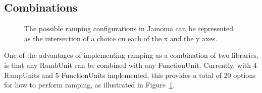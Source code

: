 \documentclass{article}
\begin{document}



\subsection{Combinations} %
\label{sec:combinations}

\begin{figure}
\centerline{}
\caption{The possible ramping configurations in Jamoma can be represented as the intersection of a choice on each of the x and the y axes.}
\label{fig:combinations}
\end{figure}

One of the advantages of implementing ramping as a combination of two libraries, is that any RambUnit can be combined with any FunctionUnit. Currently, with 4 RampUnits and 5 FunctionUnits implemented, this provides a total of 20 options for how to perform ramping, as illustrated in Figure~\ref{fig:combinations}.

\end{document}
